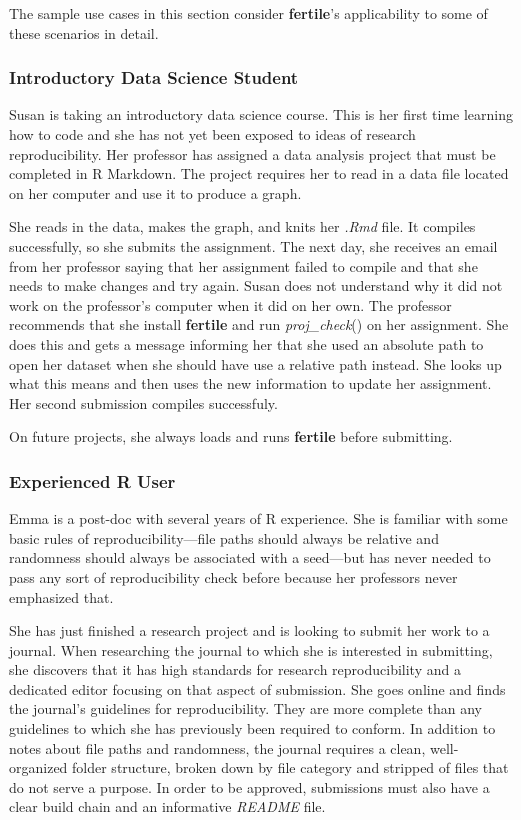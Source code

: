 \documentclass[APA,LATO1COL]{WileyNJD-v2}\usepackage[]{graphicx}\usepackage[]{color}
\newcommand{\R}{\textsf{R}\xspace}
\newcommand{\cmd}[1]{\textit{#1}}
\newcommand{\pkg}[1]{\textbf{#1}}
\newcommand{\func}[1]{\textit{#1}()}
\begin{document}
The sample use cases in this section consider \pkg{fertile}'s applicability to some of these scenarios in detail.

\subsubsection{Introductory Data Science Student}

Susan is taking an introductory data science course. This is her first time learning how to code and she has not yet been exposed to ideas of research reproducibility. Her professor has assigned a data analysis project that must be completed in \R Markdown. The project requires her to read in a data file located on her computer and use it to produce a graph.

She reads in the data, makes the graph, and knits her \cmd{.Rmd} file. It compiles successfully, so she submits the assignment. The next day, she receives an email from her professor saying that her assignment failed to compile and that she needs to make changes and try again. Susan does not understand why it did not work on the professor's computer when it did on her own. The professor recommends that she install \pkg{fertile} and run \func{proj\_check} on her assignment. She does this and gets a message informing her that she used an absolute path to open her dataset when she should have use a relative path instead. She looks up what this means and then uses the new information to update her assignment. Her second submission compiles successfuly.

On future projects, she always loads and runs \pkg{fertile} before submitting.

\subsubsection{Experienced \R User}

Emma is a post-doc with several years of \R experience. She is familiar with some basic rules of reproducibility---file paths should always be relative and randomness should always be associated with a seed---but has never needed to pass any sort of reproducibility check before because her professors never emphasized that.

She has just finished a research project and is looking to submit her work to a journal. When researching the journal to which she is interested in submitting, she discovers that it has high standards for research reproducibility and a dedicated editor focusing on that aspect of submission. She goes online and finds the journal's guidelines for reproducibility. They are more complete than any guidelines to which she has previously been required to conform. In addition to notes about file paths and randomness, the journal requires a clean, well-organized folder structure, broken down by file category and stripped of files that do not serve a purpose. In order to be approved, submissions must also have a clear build chain and an informative \cmd{README} file.
\end{document}

